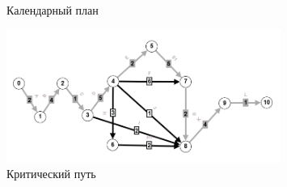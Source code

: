 \documentclass{article}
\begin{document}
\begin{enumerate}
\begin{figure}[ht]
    \caption{Календарный план}
    \label{fig:19_calendar_plan}
\end{figure}
\begin{figure}[!ht]
    \centering
    \includegraphics[width=0.8\textwidth, center]{attachments/19/19_1.png}
    \caption{Критический путь}
    \label{fig:19_critical}
\end{figure}
\end{enumerate}
\end{document}
